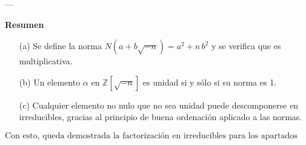 ---

\noindent
\textbf{Resumen}

\begin{itemize}
    \item[(a)] Se define la norma $N(a+b\sqrt{-n}) = a^2 + n\,b^2$ y se verifica que es multiplicativa.
    \item[(b)] Un elemento $\alpha$ en $\mathbb{Z}[\sqrt{-n}]$ es unidad si y sólo si su norma es 1.
    \item[(c)] Cualquier elemento no nulo que no sea unidad puede descomponerse en irreducibles, gracias al principio de buena ordenación aplicado a las normas.
\end{itemize}

\[
\boxed{\text{Con esto, queda demostrada la factorización en irreducibles para los apartados (a), (b) y (c).}}
\]


